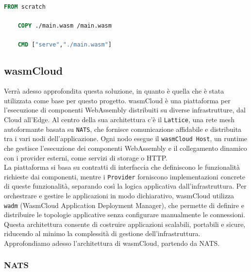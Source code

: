 \begin{lstlisting}[language=Dockerfile, caption={Esempio Dockerfile per modulo Wasm}, captionpos=b, label={code:dockerfile_example_wasm}]
    FROM scratch
    
    COPY ./main.wasm /main.wasm
    
    CMD ["serve","./main.wasm"]
\end{lstlisting}

\subsection{wasmCloud}
\label{sec:wasmcloud}

Verrà adesso approfondita questa soluzione, in quanto è quella che è stata utilizzata come base per questo progetto. wasmCloud\cite{wasmcloud} è una piattaforma per l'esecuzione di componenti WebAssembly distribuiti su diverse infrastrutture, dal Cloud all'Edge. Al centro della sua architettura c'è il \texttt{Lattice}, una rete mesh autoformante basata su \texttt{NATS}, che fornisce comunicazione affidabile e distribuita tra i vari nodi dell'applicazione. Ogni nodo esegue il \texttt{wasmCloud Host}, un runtime che gestisce l'esecuzione dei componenti WebAssembly e il collegamento dinamico con i provider esterni, come servizi di storage o HTTP.\\
La piattaforma si basa su contratti di interfaccia che definiscono le funzionalità richieste dai componenti, mentre i \texttt{Provider} forniscono implementazioni concrete di queste funzionalità, separando così la logica applicativa dall'infrastruttura. Per orchestrare e gestire le applicazioni in modo dichiarativo, wasmCloud utilizza \texttt{wadm} (WasmCloud Application Deployment Manager), che permette di definire e distribuire le topologie applicative senza configurare manualmente le connessioni.\\
Questa architettura consente di costruire applicazioni scalabili, portabili e sicure, riducendo al minimo la complessità di gestione dell'infrastruttura.\\
Approfondiamo adesso l'architettura di wasmCloud, partendo da NATS.

\subsubsection{NATS}

